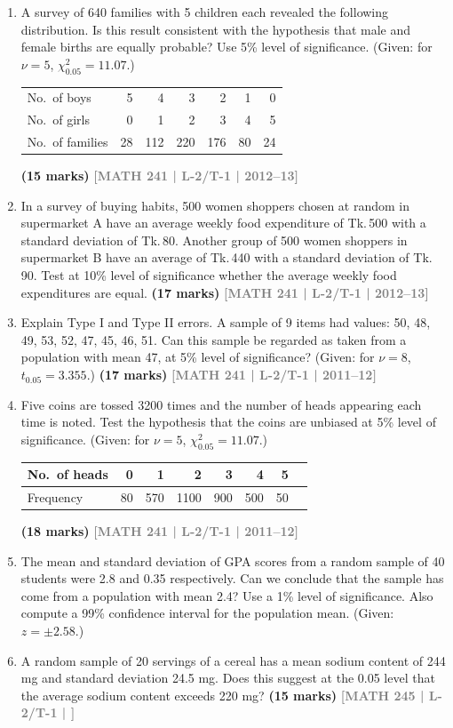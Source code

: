 \documentclass[12pt,a4paper]{article}
\newcommand{\yr}[1]{\hfill\textcolor{gray}{\small\textbf{[#1]}}}
\newcommand{\mk}[1]{\textcolor{orange!70!black}{\small\textbf{(#1 marks)}}}
\begin{document}
\begin{enumerate}
\item A survey of 640 families with 5 children each revealed the following distribution. Is this result consistent with the hypothesis that male and female births are equally probable? Use 5\% level of significance. (Given: for $\nu=5$, $\chi^{2}_{0.05}=11.07$.)
\begin{center}
\begin{tabular}{lrrrrrr}
\toprule
No.\ of boys  & 5  & 4   & 3   & 2   & 1  & 0  \\
No.\ of girls & 0  & 1   & 2   & 3   & 4  & 5  \\
\midrule
No.\ of families & 28 & 112 & 220 & 176 & 80 & 24 \\
\bottomrule
\end{tabular}
\end{center}
\mk{15} \yr{MATH 241 | L-2/T-1 | 2012--13}

\item In a survey of buying habits, 500 women shoppers chosen at random in supermarket A have an average weekly food expenditure of Tk.\,500 with a standard deviation of Tk.\,80. Another group of 500 women shoppers in supermarket B have an average of Tk.\,440 with a standard deviation of Tk.\,90. Test at 10\% level of significance whether the average weekly food expenditures are equal.
\mk{17} \yr{MATH 241 | L-2/T-1 | 2012--13}

\item Explain Type I and Type II errors. A sample of 9 items had values: 50, 48, 49, 53, 52, 47, 45, 46, 51. Can this sample be regarded as taken from a population with mean 47, at 5\% level of significance? (Given: for $\nu=8$, $t_{0.05}=3.355$.)
\mk{17} \yr{MATH 241 | L-2/T-1 | 2011--12}

\item Five coins are tossed 3200 times and the number of heads appearing each time is noted. Test the hypothesis that the coins are unbiased at 5\% level of significance. (Given: for $\nu=5$, $\chi^{2}_{0.05}=11.07$.)
\begin{center}
\begin{tabular}{lrrrrrrr}
\toprule
No.\ of heads & 0 & 1 & 2 & 3 & 4 & 5 \\
\midrule
Frequency & 80 & 570 & 1100 & 900 & 500 & 50 \\
\bottomrule
\end{tabular}
\end{center}
\mk{18} \yr{MATH 241 | L-2/T-1 | 2011--12}

\item The mean and standard deviation of GPA scores from a random sample of 40 students were 2.8 and 0.35 respectively. Can we conclude that the sample has come from a population with mean 2.4? Use a 1\% level of significance. Also compute a 99\% confidence interval for the population mean. (Given: $z=\pm2.58$.)


\item A random sample of 20 servings of a cereal has a mean sodium content of 244 mg and standard deviation 24.5 mg. Does this suggest at the 0.05 level that the average sodium content exceeds 220 mg?
\mk{15} \yr{MATH 245 | L-2/T-1 | }

\end{enumerate}
\end{document}
